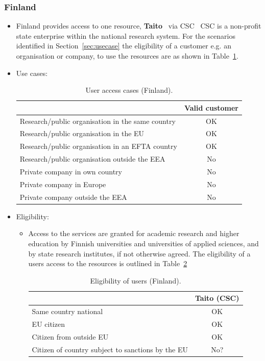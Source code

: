 \documentclass{article}
\begin{document}
\subsubsection{Finland}
\begin{itemize}
    \item []
Finland provides access to one resource, {\textbf{Taito}}~\cite{csc-taito} via CSC~\cite{csc} 
CSC is a non-profit state enterprise within the national research system. 
For the scenarios identified in Section~\ref{sec:usecase} the eligibility of a customer e.g. an organisation or company, to use the resources are as shown in Table~\ref{tab:FI_use_cases}. 

\item[] Use cases:
    \begin{table}[!h]
        \centering
        \begin{tabular}{|l|c|}
        \hline
             & Valid customer  \\
        \hline
Research/public organisation in the same country & OK \\
        \hline
Research/public organisation in the EU & OK \\
        \hline
Research/public organisation in an EFTA country & OK\\
        \hline
Research/public organisation outside the EEA & No \\
        \hline
Private company in own country & No \\
        \hline
Private company in Europe    & No \\
        \hline
Private company outside the EEA & No \\
        \hline 
        \end{tabular}
        \caption{User access cases (Finland).}
        \label{tab:FI_use_cases}
    \end{table}
    
\item[]Eligibility:
\begin{itemize} 
\item[] Access to the services are granted for academic research and higher education by Finnish universities and universities of applied sciences, and by state research institutes, if not otherwise agreed. The eligibility of a users access to the resources is outlined in Table~\ref{tab:FI_user_eligibility}
\begin{table}[!h]
    \centering
    \begin{tabular}{|l|c|}
        \hline
    & Taito (CSC)  \\
    \hline
  Same country national      &  OK \\
    \hline
    EU citizen       &  OK\\
        \hline
        Citizen from outside EU	         &  OK \\
        \hline 
        Citizen of country subject to sanctions by the EU  & No? \\
        \hline
        \end{tabular}
    \caption{Eligibility of users (Finland).}
    \label{tab:FI_user_eligibility}
\end{table}
\end{itemize} 


\end{itemize}
\end{document}
